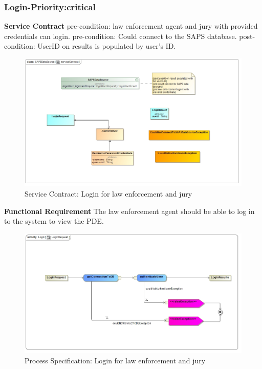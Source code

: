 \documentclass[a4paper,12pt]{article}
\begin{document}
\subsubsection{Login-Priority:critical}
\textbf{Service Contract}\newline
pre-condition: law enforcement agent and jury with provided credentials can login.\newline
pre-condition: Could connect to the SAPS database.\newline
post-condition: UserID on results is populated by user's ID.\newline
\begin{figure}[H]
\includegraphics[width=\textwidth]{images/SAPSserviceContract.jpg}
\caption{Service Contract: Login for law enforcement and jury\label{overflow}}
\end{figure}\newpage
\textbf{Functional Requirement}\newline
The law enforcement agent should be able to log in to the system to view the PDE.\newline
\begin{figure}[H]
\includegraphics[width=\textwidth]{images/LoginRequest.jpg}
\caption{Process Specification: Login for law enforcement and jury\label{overflow}}
\end{figure}
\end{document}
